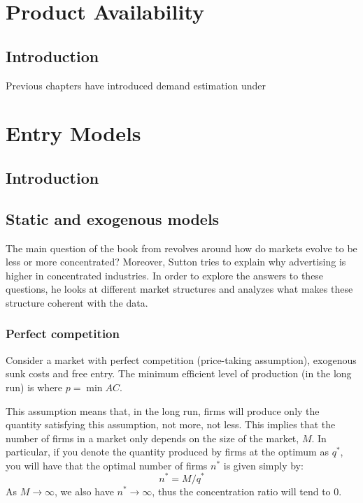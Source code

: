 \documentclass[12pt]{report}
\begin{document}
\chapter{Product Availability}

\section{Introduction}

Previous chapters have introduced demand estimation under 

\chapter{Entry Models}

\section{Introduction}



\section{Static and exogenous models}

The main question of the book from \cite{sutton_91} revolves around how do markets evolve to be less or more concentrated? Moreover, Sutton tries to explain why advertising is higher in concentrated industries. In order to explore the answers to these questions, he looks at different market structures and analyzes what makes these structure coherent with the data.

\subsection{Perfect competition}

Consider a market with perfect competition (price-taking assumption), exogenous sunk costs and free entry. The minimum efficient level of production (in the long run) is where $p = \min AC $. 

This assumption means that, in the long run, firms will produce only the quantity satisfying this assumption, not more, not less. This implies that the number of firms in a market only depends on the size of the market, $M$. In particular, if you denote the quantity produced by firms at the optimum as $q^*$, you will have that the optimal number of firms $n^*$ is given simply by: $$n^* = M/q^* $$
As $M\to\infty$, we also have $n^*\to\infty$, thus the concentration ratio will tend to 0.
\end{document}
